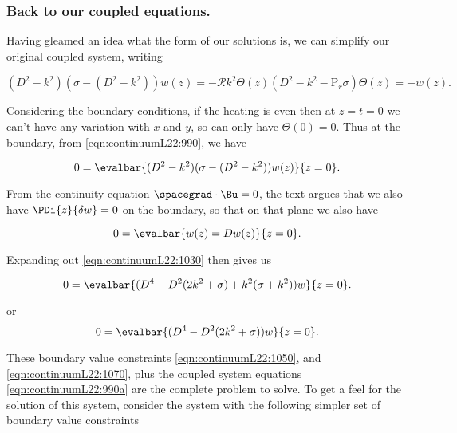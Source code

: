 \subsubsection{Back to our coupled equations.}

Having gleamed an idea what the form of our solutions is, we can simplify our original coupled system, writing

\begin{subequations}
\label{eqn:continuumL22:990a}
\begin{equation}\label{eqn:continuumL22:990}
(D^2 - k^2) ( \sigma - (D^2 - k^2) ) w(z) = -\mathcal{R} k^2 \Theta(z)
\end{equation}
\begin{equation}\label{eqn:continuumL22:1010}
(D^2 - k^2 -\text{P}_r \sigma ) \Theta(z) = -w(z).
\end{equation}
\end{subequations}

Considering the boundary conditions, if the heating is even then at $z = t = 0$ we can't have any variation with $x$ and $y$, so can only have $\Theta(0) = 0$.  Thus at the boundary, from \ref{eqn:continuumL22:990}, we have

\begin{equation}\label{eqn:continuumL22:1030}
0 = \evalbar{(D^2 - k^2) ( \sigma - (D^2 - k^2) ) w(z)}{z = 0}.
\end{equation}

From the continuity equation $\spacegrad \cdot \Bu = 0$, the text argues that we also have $\PDi{z}{\delta w} = 0$ on the boundary, so that on that plane we also have

\begin{equation}\label{eqn:continuumL22:1050}
0 = \evalbar{w(z) = D w(z)}{z = 0}.
\end{equation}

Expanding out \ref{eqn:continuumL22:1030} then gives us

\begin{equation}\label{eqn:continuumL22:1070}
0 = \evalbar{(D^4 - D^2 ( 2 k^2 + \sigma ) + k^2(\sigma + k^2))w}{z = 0}.
\end{equation}

or
\begin{equation}\label{eqn:continuumL22:1070}
0 = \evalbar{(D^4 - D^2 ( 2 k^2 + \sigma ))w}{z = 0}.
\end{equation}

These boundary value constraints \ref{eqn:continuumL22:1050}, and \ref{eqn:continuumL22:1070}, plus the coupled system equations \ref{eqn:continuumL22:990a} are the complete problem to solve.  To get a feel for the solution of this system, consider the system with the following simpler set of boundary value constraints

